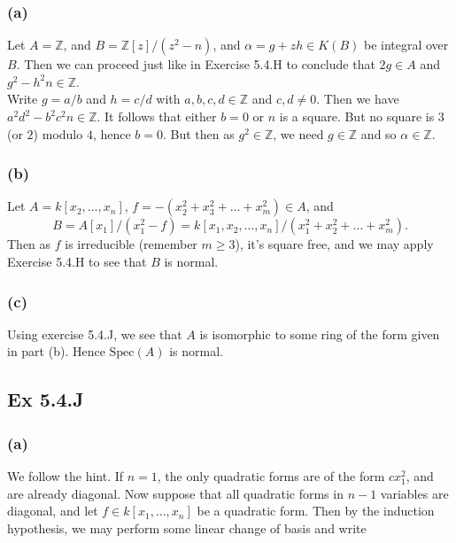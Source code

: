 \documentclass{article}
\theoremstyle{definition}
\newcommand{\Z}{\mathbb{Z}}
\newcommand{\Spec}{\text{Spec}}
\begin{document}
\subsubsection*{(a)}

Let $A = \Z$, and $B = \Z[z]/(z^2 - n)$, and $\alpha = g + z h \in K(B)$
be integral over $B$. Then we can proceed just like in Exercise 5.4.H
to conclude that $2g \in A$ and $g^2 - h^2 n \in \Z$. \\

Write $g = a/b$ and $h = c/d$ with $a,b,c,d \in \Z$ and $c, d \not = 0$. Then
we have $a^2d^2 - b^2c^2 n \in \Z$. It follows that either $b = 0$ or $n$ is a
square. But no square is $3$ (or $2$) modulo $4$, hence $b = 0$. But then as
$g^2 \in \Z$, we need $g \in \Z$ and so $\alpha \in \Z$.

\subsubsection*{(b)}

Let $A = k[x_2, \ldots, x_n]$, $f = -(x_2^2 + x_3^2 + \ldots + x_m^2) \in A$,
and
\[
	B 
	= 
	A[x_1]/(x_1^2 - f) 
	= 
	k[x_1, x_2, \ldots, x_n]/(x_1^2 + x_2^2 + \ldots + x_m^2).
\]
Then as $f$ is irreducible (remember $m \geq 3$), it's square free, and we may
apply Exercise 5.4.H to see that $B$ is normal.

\subsubsection*{(c)}

Using exercise 5.4.J, we see that $A$ is isomorphic to some ring of the form
given in part (b). Hence $\Spec(A)$ is normal.

\subsection*{Ex 5.4.J}

\subsubsection*{(a)}

We follow the hint. If $n = 1$, the only quadratic forms are of the form $c
x_1^2$, and are already diagonal. Now suppose that all quadratic forms in $n -
1$ variables are diagonal, and let $f \in k[x_1, \ldots, x_n]$ be a quadratic
form. Then by the induction hypothesis, we may perform some linear change of
basis and write
\end{document}
